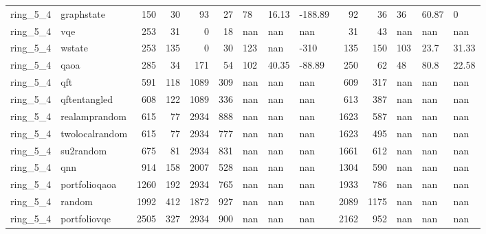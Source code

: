 \begin{longtable}{llrrrrlllrrlll}
ring\_5\_4 & graphstate & 150 & 30 & 93 & 27 & 78 & 16.13 & -188.89 & 92 & 36 & 36 & 60.87 & 0 \\
ring\_5\_4 & vqe & 253 & 31 & 0 & 18 & nan & nan & nan & 31 & 43 & nan & nan & nan \\
ring\_5\_4 & wstate & 253 & 135 & 0 & 30 & 123 & nan & -310 & 135 & 150 & 103 & 23.7 & 31.33 \\
ring\_5\_4 & qaoa & 285 & 34 & 171 & 54 & 102 & 40.35 & -88.89 & 250 & 62 & 48 & 80.8 & 22.58 \\
ring\_5\_4 & qft & 591 & 118 & 1089 & 309 & nan & nan & nan & 609 & 317 & nan & nan & nan \\
ring\_5\_4 & qftentangled & 608 & 122 & 1089 & 336 & nan & nan & nan & 613 & 387 & nan & nan & nan \\
ring\_5\_4 & realamprandom & 615 & 77 & 2934 & 888 & nan & nan & nan & 1623 & 587 & nan & nan & nan \\
ring\_5\_4 & twolocalrandom & 615 & 77 & 2934 & 777 & nan & nan & nan & 1623 & 495 & nan & nan & nan \\
ring\_5\_4 & su2random & 675 & 81 & 2934 & 831 & nan & nan & nan & 1661 & 612 & nan & nan & nan \\
ring\_5\_4 & qnn & 914 & 158 & 2007 & 528 & nan & nan & nan & 1304 & 590 & nan & nan & nan \\
ring\_5\_4 & portfolioqaoa & 1260 & 192 & 2934 & 765 & nan & nan & nan & 1933 & 786 & nan & nan & nan \\
ring\_5\_4 & random & 1992 & 412 & 1872 & 927 & nan & nan & nan & 2089 & 1175 & nan & nan & nan \\
ring\_5\_4 & portfoliovqe & 2505 & 327 & 2934 & 900 & nan & nan & nan & 2162 & 952 & nan & nan & nan \\
\end{longtable}
